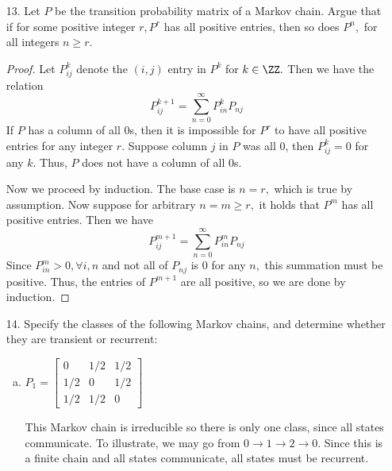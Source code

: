 \documentclass{article}
\begin{document}
\begin{itemize}
\begin{proof}
\begin{align*}
				&= \frac{p}{2} + \frac{p}{2}(2p-1)^k + \frac{1}{2} - \frac{1}{2}(2p-1)^k - \frac{p}{2} + \frac{p}{2}(2p-1)^k \\
				&= \frac{1}{2} + \left( p-\frac{1}{2} \right)(2p-1)^k = \frac{1}{2} + \frac{1}{2}(2p-1)^{k+1} \\
				P_{01}=P_{10} &= (1-p)\left( \frac{1}{2}+\frac{1}{2}(2p-1)^k \right) + p\left( \frac{1}{2}-\frac{1}{2}(2p-1)^k \right) \\
				&= \frac{1}{2}+\frac{1}{2}(2p-1)^k - \frac{p}{2} + \frac{p}{2}(2p-1)^k + \frac{p}{2} - \frac{p}{2}(2p-1)^k \\
				&= \frac{1}{2} - \left( p-\frac{1}{2} \right)(2p-1)^k = \frac{1}{2}-\frac{1}{2}(2p-1)^k
			\end{align*}
			so the formula holds for $k+1,$ and the statement is proven.
		\end{proof}

	\item[13.] Let $P$ be the transition probability matrix of a Markov chain. Argue that if for some positive integer $r, P^r$ has all positive entries, then so does $P^n,$ for all integers $n\ge r.$
		\begin{proof}
			Let $P_{ij}^k$ denote the $(i, j)$ entry in $P^k$ for $k\in\ZZ.$ Then we have the relation
			\[P^{k+1}_{ij} = \sum_{n=0}^{\infty}P^{k}_{in}P_{nj}\]
			If $P$ has a column of all 0s, then it is impossible for $P^r$ to have all positive entries for any integer $r.$ Suppose column $j$ in $P$ was all 0, then $P_{ij}^k=0$ for any $k.$ Thus, $P$ does not have a column of all 0s.

			Now we proceed by induction. The base case is $n=r,$ which is true by assumption. Now suppose for arbitrary $n=m\ge r,$ it holds that $P^m$ has all positive entries. Then we have
			\[P^{m+1}_{ij} = \sum_{n=0}^{\infty}P^m_{in}P_{nj}\]
			Since $P^m_{in}>0, \forall i, n$ and not all of $P_{nj}$ is 0 for any $n,$ this summation must be positive. Thus, the entries of $P^{m+1}$ are all positive, so we are done by induction.
		\end{proof}

	\item[14.] Specify the classes of the following Markov chains, and determine whether they are transient or recurrent:
		\begin{enumerate}[(a)]
			\item $P_1=\begin{bmatrix}
					0 & 1/2 & 1/2 \\ 1/2 & 0 & 1/2 \\ 1/2 & 1/2 & 0
				\end{bmatrix}$
				\begin{soln}
					This Markov chain is irreducible so there is only one class, since all states communicate. To illustrate, we may go from $0\to1\to2\to0.$ Since this is a finite chain and all states communicate, all states must be recurrent.
				\end{soln}


\end{enumerate}
\end{itemize}
\end{document}
